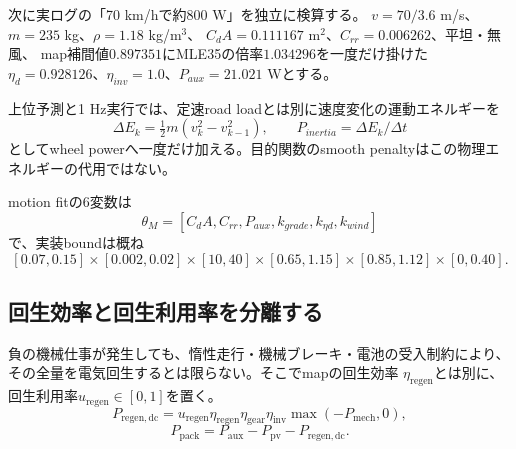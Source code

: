
次に実ログの「70 km/hで約800 W」を独立に検算する。
$v=70/3.6$ m/s、$m=235$ kg、$\rho=1.18$ kg/m$^3$、
$C_dA=0.111167$ m$^2$、$C_{rr}=0.006262$、平坦・無風、
map補間値$0.897351$にMLE35の倍率$1.034296$を一度だけ掛けた
$\eta_d=0.928126$、$\eta_{inv}=1.0$、$P_{aux}=21.021$ Wとする。


上位予測と1 Hz実行では、定速road loadとは別に速度変化の運動エネルギーを
\[
\Delta E_k=\tfrac12m(v_k^2-v_{k-1}^2),\qquad
P_{inertia}=\Delta E_k/\Delta t
\]
としてwheel powerへ一度だけ加える。目的関数のsmooth penaltyはこの物理エネルギーの代用ではない。


motion fitの6変数は
\[
\theta_M=[C_dA,C_{rr},P_{aux},k_{grade},k_{\eta d},k_{wind}]
\]
で、実装boundは概ね
\[
[0.07,0.15]\times[0.002,0.02]\times[10,40]\times
[0.65,1.15]\times[0.85,1.12]\times[0,0.40].
\]


\subsection{回生効率と回生利用率を分離する}
負の機械仕事が発生しても、惰性走行・機械ブレーキ・電池の受入制約により、
その全量を電気回生するとは限らない。そこでmapの回生効率
$\eta_{\mathrm{regen}}$とは別に、回生利用率$u_{\mathrm{regen}}\in[0,1]$を置く。
\[
P_{\mathrm{regen,dc}}=
u_{\mathrm{regen}}\eta_{\mathrm{regen}}\eta_{\mathrm{gear}}
\eta_{\mathrm{inv}}\max(-P_{\mathrm{mech}},0),
\]
\[
P_{\mathrm{pack}}=P_{\mathrm{aux}}-P_{\mathrm{pv}}-P_{\mathrm{regen,dc}}.
\]

